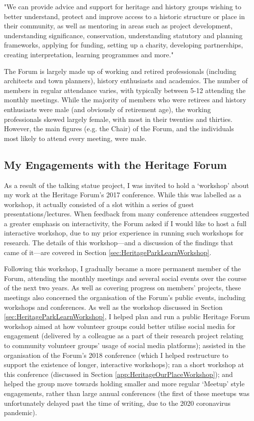\begin{displayquote}
"We can provide advice and support for heritage and history groups wishing to better understand, protect and improve access to a historic structure or place in their community, as well as mentoring in areas such as project development, understanding significance, conservation, understanding statutory and planning frameworks, applying for funding, setting up a charity, developing partnerships, creating interpretation, learning programmes and more."
\end{displayquote}

The Forum is largely made up of working and retired professionals (including architects and town planners), history enthusiasts and academics. The number of members in regular attendance varies, with typically between 5-12 attending the monthly meetings. While the majority of members who were retirees and history enthusiasts were male (and obviously of retirement age), the working professionals skewed largely female, with most in their twenties and thirties. However, the main figures (e.g. the Chair) of the Forum, and the individuals most likely to attend every meeting, were male.

\subsection{My Engagements with the Heritage Forum}
As a result of the talking statue project, I was invited to hold a `workshop' about my work at the Heritage Forum's 2017 conference. While this was labelled as a workshop, it actually consisted of a slot within a series of guest presentations/lectures. When feedback from many conference attendees suggested a greater emphasis on interactivity, the Forum asked if I would like to host a full interactive workshop, due to my prior experience in running such workshops for research. The details of this workshop---and a discussion of the findings that came of it---are covered in Section \ref{sec:HeritageParkLearnWorkshop}.

Following this workshop, I gradually became a more permanent member of the Forum, attending the monthly meetings and several social events over the course of the next two years. As well as covering progress on members' projects, these meetings also concerned the organisation of the Forum's public events, including workshops and conferences. As well as the workshop discussed in Section \ref{sec:HeritageParkLearnWorkshop}, I helped plan and run a public Heritage Forum workshop aimed at how volunteer groups could better utilise social media for engagement (delivered by a colleague as a part of their research project relating to community volunteer groups' usage of social media platforms); assisted in the organisation of the Forum's 2018 conference (which I helped restructure to support the existence of longer, interactive workshops); ran a short workshop at this conference (discussed in Section \ref{app:HeritageOurPlaceWorkshop}); and helped the group move towards holding smaller and more regular `Meetup' style engagements, rather than large annual conferences (the first of these meetups was unfortunately delayed past the time of writing, due to the 2020 coronavirus pandemic).

